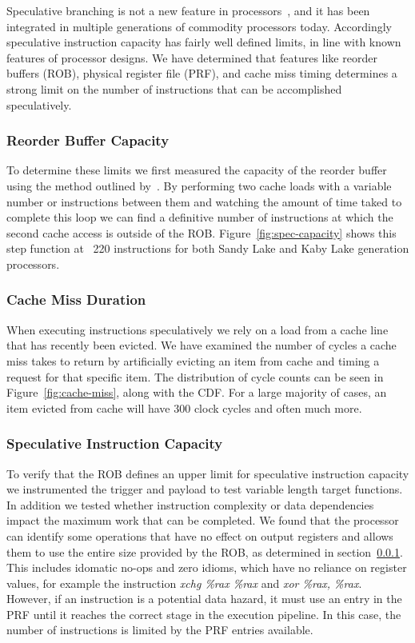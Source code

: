 Speculative branching is not a new feature in processors~\cite{branching-hist}, 
and it has been integrated in multiple generations of commodity processors today. 
Accordingly speculative instruction capacity has fairly well defined limits, in 
line with known features of processor designs. We have determined that features 
like reorder buffers (ROB), physical register file (PRF), and cache miss timing
determines a strong limit on the number of instructions that can be accomplished
speculatively. 

\subsubsection{Reorder Buffer Capacity} \label{sssec:ROB}
To determine these limits we first measured the capacity of the reorder buffer
using the method outlined by~\cite{intel-rob-capacity}. By performing two cache loads
with a variable number or instructions between them and watching the amount of 
time taked to complete this loop we can find a definitive number of instructions
at which the second cache access is outside of the ROB. Figure~\ref{fig:spec-capacity}
shows this step function at ~220 instructions for both Sandy Lake and Kaby Lake 
generation processors. 

\subsubsection{Cache Miss Duration}
When executing instructions speculatively we rely on a load from a cache line that
has recently been evicted. We have examined the number of cycles a
cache miss takes to return by artificially evicting an item from cache and timing 
a request for that specific item. The distribution of cycle counts can be seen in
Figure~\ref{fig:cache-miss}, along with the CDF. For a large majority of cases, 
an item evicted from cache will have 300 clock cycles and often much more. 

\subsubsection{Speculative Instruction Capacity}
To verify that the ROB defines an upper limit for speculative instruction capacity
we instrumented the trigger and payload to test variable length target functions. 
In addition we tested whether instruction complexity or data dependencies impact
the maximum work that can be completed. We found that the processor can identify 
some operations that have no effect on output registers and allows them to use the 
entire size provided by the ROB, as determined in section~\ref{sssec:ROB}. This includes 
idomatic no-ops and zero idioms, which have no reliance on register values, 
for example the instruction \textit{xchg \%rax \%rax} and \textit{xor \%rax, \%rax}. 
However, if an instruction is a potential data hazard, it must use an entry in the PRF
until it reaches the correct stage in the execution pipeline. In this case, the number 
of instructions is limited by the PRF entries available.

